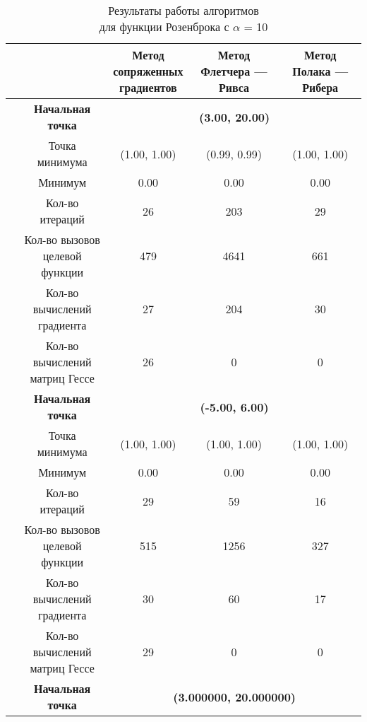 \begin{table}[H]
        \centering
        \vspace*{-1.5em}
        \caption{Результаты работы алгоритмов\\для функции Розенброка с $\alpha$ = 10}
        \footnotesize
        \begin{tabular}{|c|c|c|c|c|}
        \hline
        & &\makecell{Метод\\сопряженных\\градиентов} &\makecell{Метод\\Флетчера --- Ривса} &\makecell{Метод\\Полака --- Рибера} \\
        \hline
	\multirow{12}{*}{\rotatebox[origin=c]{90}{$\varepsilon = 0.01$}}&\textbf{Начальная точка} &\multicolumn{3}{c|}{\textbf{(3.00, 20.00)}}\\
	\cline{2-5}
	&Точка минимума &(1.00, 1.00) &(0.99, 0.99) &(1.00, 1.00) \\ 
	\cline{2-5}
	&Минимум &0.00 &0.00 &0.00 \\ 
	\cline{2-5}
	&Кол-во итераций &26 &203 &29 \\ 
	\cline{2-5}
	&\makecell{Кол-во вызовов\\целевой функции} &479 &4641 &661 \\ 
	\cline{2-5}
	&\makecell{Кол-во вычислений\\градиента} &27 &204 &30 \\ 
	\cline{2-5}
	&\makecell{Кол-во вычислений\\матриц Гессе} &26 &0 &0 \\ 
	\cline{2-5}
\cline{2-5}&\textbf{Начальная точка} &\multicolumn{3}{c|}{\textbf{(-5.00, 6.00)}}\\
	\cline{2-5}
	&Точка минимума &(1.00, 1.00) &(1.00, 1.00) &(1.00, 1.00) \\ 
	\cline{2-5}
	&Минимум &0.00 &0.00 &0.00 \\ 
	\cline{2-5}
	&Кол-во итераций &29 &59 &16 \\ 
	\cline{2-5}
	&\makecell{Кол-во вызовов\\целевой функции} &515 &1256 &327 \\ 
	\cline{2-5}
	&\makecell{Кол-во вычислений\\градиента} &30 &60 &17 \\ 
	\cline{2-5}
	&\makecell{Кол-во вычислений\\матриц Гессе} &29 &0 &0 \\ 
	\cline{2-5}
	\hline
	\multirow{12}{*}{\rotatebox[origin=c]{90}{$\varepsilon = 1e-06$}}&\textbf{Начальная точка} &\multicolumn{3}{c|}{\textbf{(3.000000, 20.000000)}}\\

\end{tabular}
\end{table}
